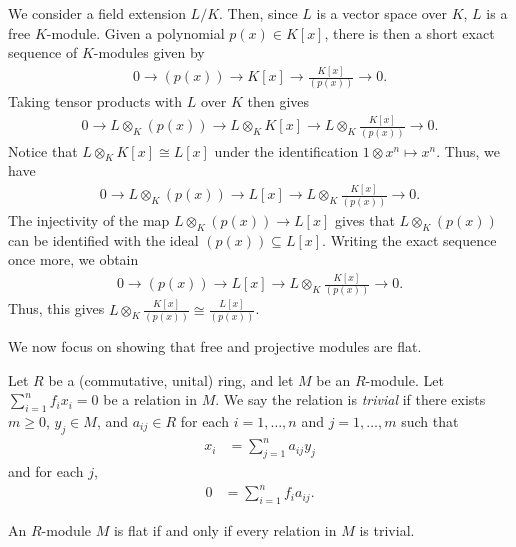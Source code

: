 \documentclass[10pt]{mypackage}
\begin{document}
\begin{example}
  We consider a field extension $L/K$. Then, since $L$ is a vector space over $K$, $L$ is a free $K$-module. Given a polynomial $p(x)\in K[x]$, there is then a short exact sequence of $K$-modules given by
  \begin{align*}
    0\rightarrow \left( p(x) \right)\rightarrow K[x]\rightarrow \frac{K[x]}{\left( p(x) \right)}\rightarrow 0.
  \end{align*}
  Taking tensor products with $L$ over $K$ then gives
  \begin{align*}
    0\rightarrow L\otimes_{K}\left( p(x) \right)\rightarrow L\otimes_{K}K[x]\rightarrow L\otimes_{K} \frac{K[x]}{\left( p(x) \right)} \rightarrow 0.
  \end{align*}
  Notice that $L\otimes_{K}K[x]\cong L[x]$ under the identification $1\otimes x^{n}\mapsto x^{n}$. Thus, we have
  \begin{align*}
    0\rightarrow L\otimes_{K} \left( p(x) \right)\rightarrow L[x]\rightarrow L\otimes_{K} \frac{K[x]}{\left( p(x) \right)}\rightarrow 0.
  \end{align*}
  The injectivity of the map $L\otimes_{K}\left( p(x) \right)\rightarrow L[x]$ gives that $L\otimes_{K}\left( p(x) \right)$ can be identified with the ideal $\left( p(x) \right)\subseteq L[x]$. Writing the exact sequence once more, we obtain
  \begin{align*}
    0\rightarrow \left( p(x) \right)\rightarrow L[x]\rightarrow L\otimes_{K}\frac{K[x]}{\left( p(x) \right)}\rightarrow 0.
  \end{align*}
  Thus, this gives $L\otimes_{K}\frac{K[x]}{\left( p(x) \right)}\cong \frac{L[x]}{\left( p(x) \right)}$.
\end{example}
We now focus on showing that free and projective modules are flat.
\begin{definition}
  Let $R$ be a (commutative, unital) ring, and let $M$ be an $R$-module. Let $\sum_{i=1}^{n}f_ix_i = 0$ be a relation in $M$. We say the relation is \textit{trivial} if there exists $m \geq 0$, $y_j\in M$, and $a_{ij}\in R$ for each $i=1,\dots,n$ and $j=1,\dots,m$ such that
  \begin{align*}
    x_i &= \sum_{j=1}^{n} a_{ij}y_j
  \end{align*}
  and for each $j$,
  \begin{align*}
    0 &= \sum_{i=1}^{n}f_ia_{ij}.
  \end{align*}
\end{definition}
\begin{lemma}
  An $R$-module $M$ is flat if and only if every relation in $M$ is trivial.
\end{lemma}
\end{document}
